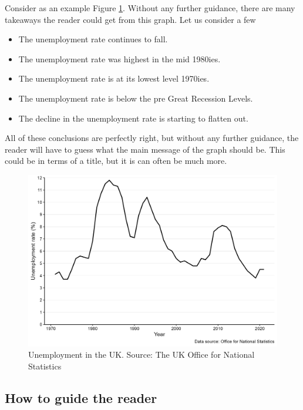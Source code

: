 \documentclass[
]{book}
\providecommand{\tightlist}{%
  \setlength{\itemsep}{0pt}\setlength{\parskip}{0pt}}
\begin{document}
Consider as an example Figure \ref{fig:desc1}. Without any further guidance, there are many takeaways the reader could get from this graph. Let us consider a few

\begin{itemize}
\tightlist
\item
  The unemployment rate continues to fall.
\item
  The unemployment rate was highest in the mid 1980ies.
\item
  The unemployment rate is at its lowest level 1970ies.
\item
  The unemployment rate is below the pre Great Recession Levels.
\item
  The decline in the unemployment rate is starting to flatten out.
\end{itemize}

All of these conclusions are perfectly right, but without any further guidance, the reader will have to guess what the main message of the graph should be. This could be in terms of a title, but it is can often be much more.

\begin{figure}

{\centering \includegraphics[width=0.8\linewidth]{./resources/chapter_describe/ex} 

}

\caption{Unemployment in the UK. Source: The UK Office for National Statistics}\label{fig:desc1}
\end{figure}

\hypertarget{how-to-guide-the-reader}{%
\subsection*{How to guide the reader}\label{how-to-guide-the-reader}}
\end{document}
